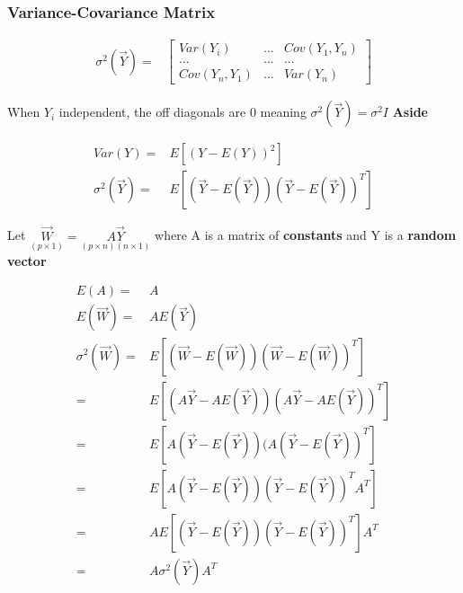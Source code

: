 \documentclass[11pt]{article}
\begin{document}
\subsubsection{Variance-Covariance Matrix}
\label{sec:org3d15192}

\begin{equation}
\begin{split}
\sigma^2(\vec{Y}) = & \begin{bmatrix}
Var(Y_i) & ... & Cov(Y_1, Y_n)\\
... & ... & ...\\
Cov(Y_n, Y_1) & ... & Var(Y_n)
\end{bmatrix}
\end{split}
\end{equation}

When \(Y_i\) independent, the off diagonals are 0 meaning \(\sigma^2(\vec{Y}) =
\sigma^2 I\)
\textbf{Aside}

\begin{equation}
\begin{split}
Var(Y) = & E[ (Y - E(Y))^2 ]\\
\sigma^2(\vec{Y}) = & E [ (\vec{Y} - E(\vec{Y}))(\vec{Y} - E(\vec{Y}))^T ]
\end{split}
\end{equation}

Let \(\underset{(p \times 1)}{\vec{W}} = \underset{(p \times n)(n \times 1)}{A
\vec{Y}}\) where A is a matrix of \textbf{constants} and Y is a \textbf{random vector}

\begin{equation}
\begin{split}
E(A) = & A\\
E(\vec{W}) = & AE(\vec{Y})\\
\sigma^2(\vec{W}) = & E[ (\vec{W} - E(\vec{W}))(\vec{W} - E(\vec{W}))^T ]\\
= & E[ (A \vec{Y} - AE(\vec{Y}))(A \vec{Y} - A E(\vec{Y}))^T ]\\
= & E[ A(\vec{Y} - E(\vec{Y}))(A(\vec{Y} - E(\vec{Y}))^T ]\\
= & E[ A(\vec{Y} - E(\vec{Y}))(\vec{Y} - E(\vec{Y}))^T A^T]\\
= & A E[ (\vec{Y} - E(\vec{Y}))(\vec{Y} - E(\vec{Y}))^T ] A^T\\
= & A \sigma^2(\vec{Y}) A^T
\end{split}
\end{equation}
\end{document}
